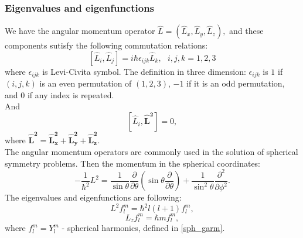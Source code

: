 \documentclass[a4paper, 12pt]{article}
\begin{document}
\subsubsection{Eigenvalues and eigenfunctions}
We have the angular momentum operator $\hat L = (\hat L_x,\hat L_y, \hat L_z),$ and these components sutisfy the following commutation relations:
\begin{equation}\label{comm_L}
	[\hat L_i, \hat L_j] =i \hbar \epsilon_{ijk}  \hat L_k, ~~~i, j, k =1,2,3
\end{equation}
where $\epsilon_{ijk}$ is Levi-Civita symbol. The definition in three dimension:  $\epsilon_{ijk}$ is $1$ if $(i, j, k)$ is an even permutation of $(1, 2, 3)$, $−1$ if it is an odd permutation, and $0$ if any index is repeated.\\
And
$$[\hat L_i, \boldsymbol{\hat L^2}] = 0, $$
where $\mathbf{\hat L^2 = \hat L_x^2+\hat L_y^2+\hat L_z^2} .$\\
The angular momentum operators are commonly used in the solution of spherical symmetry problems. Then the momentum in the spherical coordinates: 
$$-\frac{1}{\hbar^2}L^2=\frac{1}{\sin \theta}\frac{\partial}{\partial \theta}(\sin \theta \frac{\partial}{\partial \theta})+\frac{1}{\sin^2 \theta}\frac{\partial^2}{\partial \phi^2}.$$
The eigenvalues and eigenfunctions are following:
$$L^2 f_l^m = \hbar^2l(l+1) f_l^m,$$
$$L_z f_l^m = \hbar m f_l^m,$$
where $f_l^m = Y_l^m$ - spherical harmonics, defined in \eqref{sph_garm}.
\end{document}
